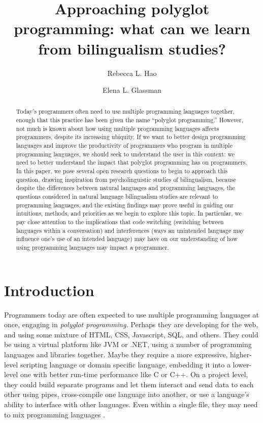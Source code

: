 \documentclass[a4paper,UKenglish,cleveref, autoref]{oasics-v2019}
\title{Approaching polyglot programming: what can we learn from bilingualism studies?}
\author{Rebecca L. Hao}{Department of Computer Science and Department of Linguistics, Harvard University, USA}{rhao@college.harvard.edu}{https://orcid.org/0000-0002-1310-2327}{}%
\author{Elena L. Glassman}{Department of Computer Science, Harvard University, USA}{glassman@seas.harvard.edu}{https://orcid.org/0000-0001-5178-3496}{}
\begin{document}
\maketitle

\begin{abstract}
Today's programmers often need to use multiple programming languages together, enough that this practice has been given the name ``polyglot programming.'' However, not much is known about how using multiple programming languages affects programmers, despite its increasing ubiquity. If we want to better design programming languages and improve the productivity of programmers who program in multiple programming languages, we should seek to understand the user in this context: we need to better understand the impact that polyglot programming has on programmers. In this paper, we pose several open research questions to begin to approach this question, drawing inspiration from psycholinguistic studies of bilingualism, because despite the differences between natural languages and programming languages, the questions considered in natural language bilingualism studies are relevant to programming languages, and the existing findings may prove useful in guiding our intuitions, methods, and priorities as we begin to explore this topic. In particular, we pay close attention to the implications that code switching (switching between languages within a conversation) and interferences (ways an unintended language may influence one's use of an intended language) may have on our understanding of how using programming languages may impact a programmer. 
\end{abstract}

\section{Introduction}
\label{sec:typesetting-summary}
Programmers today are often expected to use multiple programming languages at once, engaging in \textit{polyglot programming.} Perhaps they are developing for the web, and using some mixture of HTML, CSS, Javascript, SQL, and others. They could be using a virtual platform like JVM or .NET, using a number of programming languages and libraries together. Maybe they require a more expressive, higher-level scripting language or domain specific language, embedding it into a lower-level one with better run-time performance like C or C++. On a project level, they could build separate programs and let them interact and send data to each other using pipes, cross-compile one language into another, or use a language’s ability to interface with other languages. Even within a single file, they may need to mix programming languages \cite{stackexchange}. 
\end{document}
